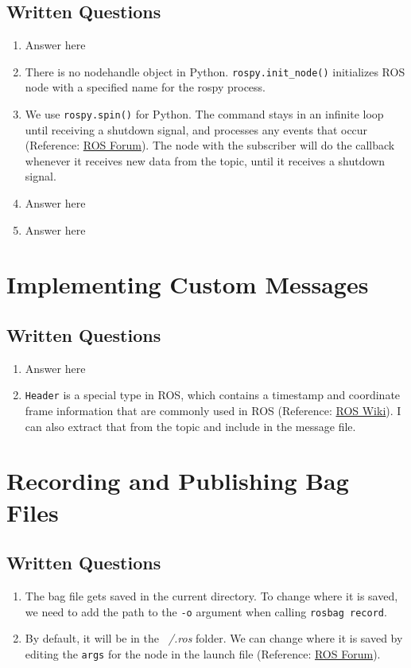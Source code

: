 \documentclass[letta4 paper]{article}
\numberwithin{equation}{section}
\newcommand{\0}{\mathbf{0}}
\begin{document}
	\subsection{Written Questions}
	\begin{enumerate}
		\item Answer here
		\item There is no nodehandle object in Python. \lstinline{rospy.init_node()} initializes ROS node with a specified name for the rospy process.
		\item We use \lstinline{rospy.spin()} for Python. The command stays in an infinite loop until receiving a shutdown signal, and processes any events that occur (Reference: \href{https://answers.ros.org/question/332192/difference-between-rospyspin-and-rospysleep/}{ROS Forum}). The node with the subscriber will do the callback whenever it receives new data from the topic, until it receives a shutdown signal.
		\item Answer here
		\item Answer here
	\end{enumerate}{}
			
	\section{ Implementing Custom Messages}
	
	\subsection{Written Questions}
	\begin{enumerate}
		\item Answer here
		\item \lstinline{Header} is a special type in ROS, which contains a timestamp and coordinate frame information that are commonly used in ROS (Reference: \href{http://wiki.ros.org/ROS/Tutorials/CreatingMsgAndSrv#Creating_a_msg}{ROS Wiki}). I can also extract that from the topic and include in the message file. 
	\end{enumerate}{}

	\section{Recording and Publishing Bag Files}
	\subsection{Written Questions}
	
	\begin{enumerate}
		\item The bag file gets saved in the current directory. To change where it is saved, we need to add the path to the \lstinline{-o} argument when calling \lstinline{rosbag record}.
		\item By default, it will be in the \textit{~/.ros} folder. We can change where it is saved by editing the \lstinline{args} for the node in the launch file (Reference: \href{https://answers.ros.org/question/106126/giving-a-directory-to-output-file-in-a-launcher-for-rosbag-record-and-rostopic-echo/?answer=222874?answer=222874#post-id-222874}{ROS Forum}).
	\end{enumerate}{}
\end{document}
